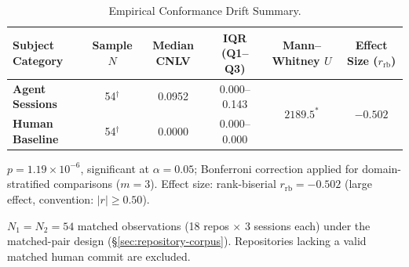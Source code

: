 \documentclass[11pt]{article}
\begin{document}
\begin{table}[t]
    \centering
    \caption{
        Empirical Conformance Drift Summary.
    }
    \label{tab:results}

    \begin{threeparttable}

    \small

    \begin{tabular}{lccccc}
        \toprule
        \textbf{Subject Category}
        &
        \textbf{Sample $N$}
        &
        \textbf{Median CNLV}
        &
        \textbf{IQR (Q1--Q3)}
        &
        \textbf{Mann--Whitney $U$}
        &
        \textbf{Effect Size ($r_{\mathrm{rb}}$)}
        \\
        \midrule

        \textbf{Agent Sessions}
        &
        54$^{\dagger}$
        &
        0.0952
        &
        0.000--0.143
        &
        \multirow{2}{*}{$2189.5^{*}$}
        &
        \multirow{2}{*}{$-0.502$}
        \\

        \textbf{Human Baseline}
        &
        54$^{\dagger}$
        &
        0.0000
        &
        0.000--0.000
        &
        &
        \\

        \bottomrule

    \end{tabular}

    \begin{tablenotes}
        \footnotesize
        \item[$*$]
        $p = 1.19 \times 10^{-6}$, significant at $\alpha=0.05$;
        Bonferroni correction applied for domain-stratified comparisons ($m=3$).
        Effect size: rank-biserial $r_{\mathrm{rb}} = -0.502$ (large effect,
        convention: $|r| \geq 0.50$).
        \item[$\dagger$]
        $N_1=N_2=54$ matched observations (18 repos $\times$ 3 sessions each)
        under the matched-pair design (\S\ref{sec:repository-corpus}).
        Repositories lacking a valid matched human commit are excluded.
    \end{tablenotes}

    \end{threeparttable}

\end{table}

\end{document}
